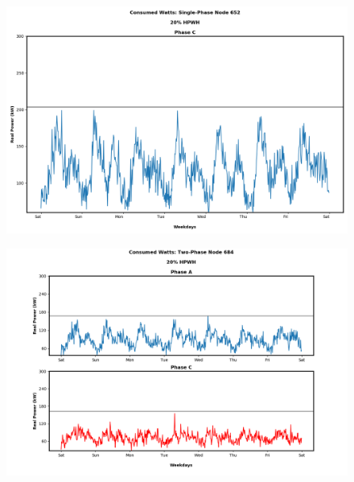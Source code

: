 \begin{figure}[H]
    \centering
    \includegraphics[width=1.1\columnwidth]{Pictures/twenty_single_phase_652_power.png}
    \caption{ }
\end{figure}

\newpage

\begin{figure}[H]
    \centering
    \includegraphics[width=1.1\columnwidth]{Pictures/twenty_two_phase_684_power.png}
    \caption{ }
\end{figure}

\newpage

